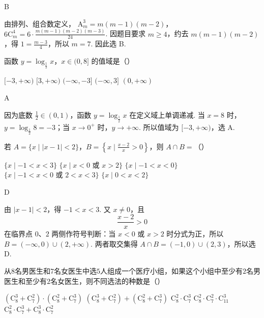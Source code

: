 \documentclass[UTF8,a4paper,oneside,11pt]{ctexbook}
\begin{document}
\begin{answer}
B
\end{answer}

\begin{solution}
由排列、组合数定义，
\(\mathrm A_m^3=m(m-1)(m-2)\)，\(6\mathrm C_m^4=6\cdot\frac{m(m-1)(m-2)(m-3)}{24}\).
因题目要求 \(m\geq4\)，约去 \(m(m-1)(m-2)\)，得 \(1=\frac{m-3}{4}\)，所以 \(m=7\). 因此选 B.
\end{solution}


\begin{problem}

函数 \(y = \log_{\frac{1}{2}} x\)，\(x \in (0, 8]\) 的值域是（\quad）

\choicesfive
    {\([-3, +\infty)\)}
    {\([3, +\infty)\)}
    {\((-\infty, -3]\)}
    {\((-\infty, 3]\)}
    {\((0, +\infty)\)}
\end{problem}

\begin{answer}
A
\end{answer}

\begin{solution}
因为底数 \(\frac{1}{2}\in(0,1)\)，函数 \(y=\log_{\frac{1}{2}}x\) 在定义域上单调递减. 当 \(x=8\) 时，\(y=\log_{\frac{1}{2}}8=-3\)；当 \(x\to0^+\) 时，\(y\to+\infty\). 所以值域为 \([-3,+\infty)\)，选 A.
\end{solution}


\begin{problem}

若 \(A = \{x \mid |x - 1| < 2\}\)，\(B = \left\{x \mid \frac{x - 2}{x} > 0 \right\}\)，则 \(A \cap B =\)（\quad）

\choicesfive
    {\(\{x\mid -1 < x < 3\}\)}
    {\(\{x \mid x < 0 \text{\ 或\ } x > 2\}\)}
    {\(\{x\mid -1 < x < 0\}\)}
    {\(\{x\mid -1 < x < 0 \text{\ 或\ } 2 < x < 3\}\)}
    {\(\{x\mid 0 < x < 2\}\)}
\end{problem}

\begin{answer}
D
\end{answer}

\begin{solution}
由 \(|x-1|<2\)，得 \(-1<x<3\). 又 \(x\neq0\)，且
\[
\frac{x-2}{x}>0
\]
在临界点 \(0\)、\(2\) 两侧作符号判断：当 \(x<0\) 或 \(x>2\) 时分式为正，所以 \(B=(-\infty,0)\cup(2,+\infty)\). 两者取交集得 \(A\cap B=(-1,0)\cup(2,3)\)，所以选 D.
\end{solution}


\begin{problem}

从\(8\)名男医生和\(7\)名女医生中选\(5\)人组成一个医疗小组，如果这个小组中至少有\(2\)名男医生和至少有\(2\)名女医生，则不同选法的种数是（\quad）

\choicesfive
    {\(\left(\mathrm C_8^3 + \mathrm C_7^2\right) \cdot \left(\mathrm C_8^2 + \mathrm C_7^3\right)\)}
    {\(\left(\mathrm C_8^3 + \mathrm C_7^2\right) + \left(\mathrm C_8^2 + \mathrm C_7^3\right)\)}
    {\(\mathrm C_8^2 \cdot \mathrm C_7^3\)}
    {\(\mathrm C_8^2 \cdot \mathrm C_7^2 \cdot \mathrm C_{11}^3\)}
    {\(\mathrm C_8^2 \cdot \mathrm C_7^3 + \mathrm C_8^3 \cdot \mathrm C_7^2\)}
\end{problem}
\end{document}
